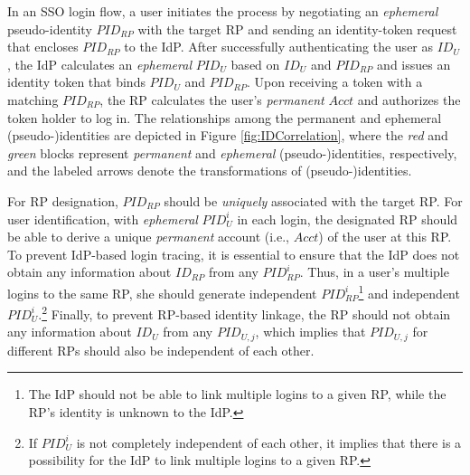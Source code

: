 \newc
In an SSO login flow, a user initiates the process by negotiating an \emph{ephemeral} pseudo-identity $PID_{RP}$  with the target RP and sending an identity-token request that encloses $PID_{RP}$ to the IdP.
After successfully authenticating the user as $ID_U$, the IdP calculates an \emph{ephemeral} $PID_U$ based on $ID_U$ and $PID_{RP}$ and issues an identity token that binds $PID_U$ and $PID_{RP}$. Upon receiving a token with a matching $PID_{RP}$, the RP calculates the user's \emph{permanent} $Acct$ and authorizes the token holder to log in.
%
The relationships among the permanent and ephemeral (pseudo-)identities are depicted in Figure \ref{fig:IDCorrelation}, where the \emph{red} and \emph{green} blocks represent \emph{permanent} and \emph{ephemeral} (pseudo-)identities, respectively, and the labeled arrows denote the transformations of (pseudo-)identities.


For RP designation, $PID_{RP}$ should be \emph{uniquely} associated with the target RP.
For user identification, with \emph{ephemeral} $PID_{U}^i$ in each login, the designated RP should be able to derive a unique \emph{permanent} account  (i.e., $Acct$) of the user at this RP.
To prevent IdP-based login tracing, it is essential to ensure that the IdP does not obtain any information about $ID_{RP}$ from any $PID_{RP}^i$.
Thus, in a user's multiple logins to the same RP, she should generate independent $PID_{RP}^i$\footnote{The IdP should not be able to link multiple logins to a given RP, while the RP's identity is unknown to the IdP.} %
and independent $PID_U^i$.\footnote{If $PID_U^i$ is not completely independent of each other, it implies that there is a possibility for the IdP to link multiple logins to a given RP.}
Finally, to prevent RP-based identity linkage,
the RP should not obtain any information about $ID_U$ from any $PID_{U,j}$, which implies that $PID_{U,j}$ for different RPs should also be independent of each other.
\oldc


